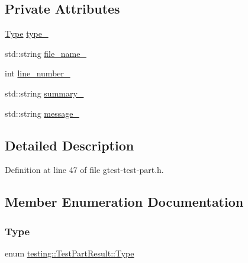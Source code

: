 \subsection*{Private Attributes}
\begin{DoxyCompactItemize}
\item 
\hyperlink{classtesting_1_1TestPartResult_a65ae656b33fdfdfffaf34858778a52d5}{Type} \hyperlink{classtesting_1_1TestPartResult_a4ee7ac490fe4f10e222fa08c3fa25437}{type\+\_\+}
\item 
std\+::string \hyperlink{classtesting_1_1TestPartResult_abf5ab5fc171dc6248579a44353385df6}{file\+\_\+name\+\_\+}
\item 
int \hyperlink{classtesting_1_1TestPartResult_a7a988009362bcdc28d3b801fc6059b5e}{line\+\_\+number\+\_\+}
\item 
std\+::string \hyperlink{classtesting_1_1TestPartResult_a6b9bce29122b56a50295710b7f6e345c}{summary\+\_\+}
\item 
std\+::string \hyperlink{classtesting_1_1TestPartResult_a9adea12d4a4fb4ebf1cd00d22eac9aff}{message\+\_\+}
\end{DoxyCompactItemize}


\subsection{Detailed Description}


Definition at line 47 of file gtest-\/test-\/part.\+h.



\subsection{Member Enumeration Documentation}
\mbox{\label{classtesting_1_1TestPartResult_a65ae656b33fdfdfffaf34858778a52d5}} 
\subsubsection{\texorpdfstring{Type}{Type}}
{\footnotesize\ttfamily enum \hyperlink{classtesting_1_1TestPartResult_a65ae656b33fdfdfffaf34858778a52d5}{testing\+::\+Test\+Part\+Result\+::\+Type}}

